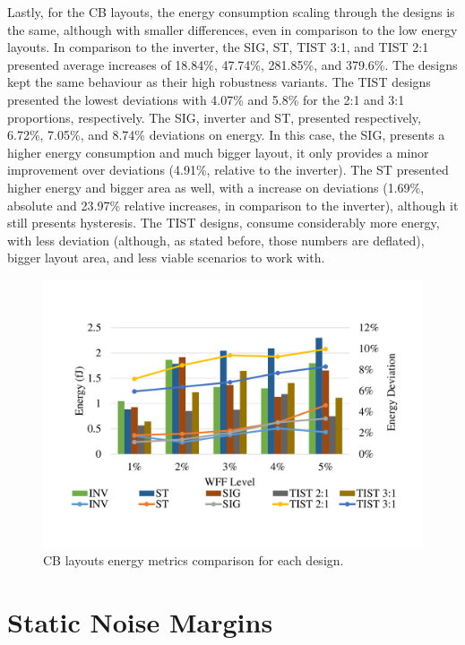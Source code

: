 \documentclass[pgmicro,mestrado,english]{iiufrgs}
\begin{document}
    Lastly, for the CB layouts, the energy consumption scaling through the designs is the same, although with smaller differences, even in comparison to the low energy layouts. In comparison to the inverter, the SIG, ST, TIST 3:1, and TIST 2:1 presented average increases of 18.84\%, 47.74\%, 281.85\%, and 379.6\%. The designs kept the same behaviour as their high robustness variants. The TIST designs presented the lowest deviations with 4.07\% and 5.8\% for the 2:1 and 3:1 proportions, respectively. The SIG, inverter and ST, presented respectively, 6.72\%, 7.05\%, and 8.74\% deviations on energy. In this case, the SIG, presents a higher energy consumption and much bigger layout, it only provides a minor improvement over deviations (4.91\%, relative to the inverter). The ST presented higher energy and bigger area as well, with a increase on deviations (1.69\%, absolute and 23.97\% relative increases, in comparison to the inverter), although it still presents hysteresis. The TIST designs, consume considerably more energy, with less deviation (although, as stated before, those numbers are deflated), bigger layout area, and less viable scenarios to work with. 
    
    \begin{figure}[]
        \centering
            \includegraphics[width=1\textwidth, trim={1.25cm 3cm 2cm 3cm}, clip]{compCB.pdf}
            \caption{CB layouts energy metrics comparison for each design.}
        \label{figCompCB}
    \end{figure}
    
    
\section{Static Noise Margins}
\end{document}
